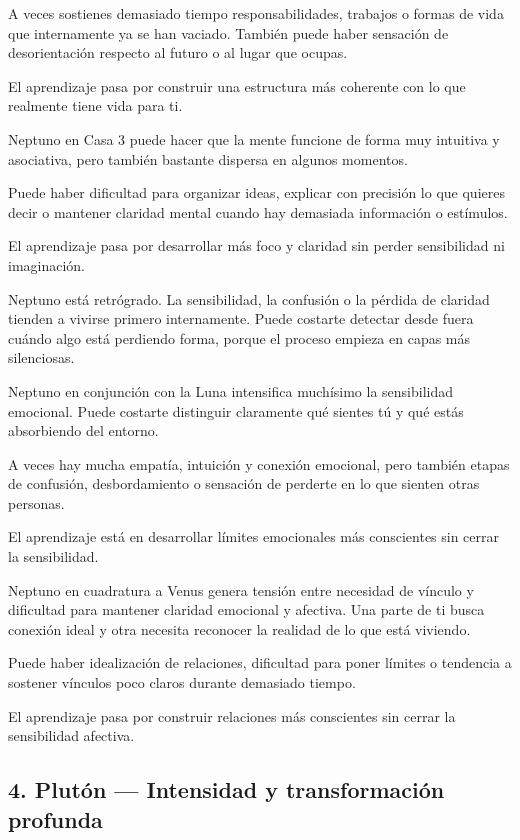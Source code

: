 \documentclass[11pt,a4paper]{article}
\begin{document}
A veces sostienes demasiado tiempo responsabilidades, trabajos o formas de vida que internamente ya se han vaciado. También puede haber sensación de desorientación respecto al futuro o al lugar que ocupas.

El aprendizaje pasa por construir una estructura más coherente con lo que realmente tiene vida para ti.

Neptuno en Casa 3 puede hacer que la mente funcione de forma muy intuitiva y asociativa, pero también bastante dispersa en algunos momentos.

Puede haber dificultad para organizar ideas, explicar con precisión lo que quieres decir o mantener claridad mental cuando hay demasiada información o estímulos.

El aprendizaje pasa por desarrollar más foco y claridad sin perder sensibilidad ni imaginación.

Neptuno está retrógrado. La sensibilidad, la confusión o la pérdida de claridad tienden a vivirse primero internamente. Puede costarte detectar desde fuera cuándo algo está perdiendo forma, porque el proceso empieza en capas más silenciosas.

Neptuno en conjunción con la Luna intensifica muchísimo la sensibilidad emocional. Puede costarte distinguir claramente qué sientes tú y qué estás absorbiendo del entorno.

A veces hay mucha empatía, intuición y conexión emocional, pero también etapas de confusión, desbordamiento o sensación de perderte en lo que sienten otras personas.

El aprendizaje está en desarrollar límites emocionales más conscientes sin cerrar la sensibilidad.

Neptuno en cuadratura a Venus genera tensión entre necesidad de vínculo y dificultad para mantener claridad emocional y afectiva. Una parte de ti busca conexión ideal y otra necesita reconocer la realidad de lo que está viviendo.

Puede haber idealización de relaciones, dificultad para poner límites o tendencia a sostener vínculos poco claros durante demasiado tiempo.

El aprendizaje pasa por construir relaciones más conscientes sin cerrar la sensibilidad afectiva.

\vspace{0.8cm}

\subsection{4. Plutón — Intensidad y transformación profunda}
\end{document}
